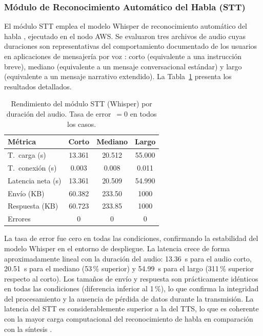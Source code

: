 \documentclass[journal]{IEEEtran}
\begin{document}
	\subsubsection{M\'odulo de Reconocimiento Autom\'atico del Habla (STT)}
	El m\'odulo STT emplea el modelo Whisper de reconocimiento autom\'atico del habla \cite{radford2023}, ejecutado en el nodo AWS. Se evaluaron tres archivos de audio cuyas duraciones son representativas del comportamiento documentado de los usuarios en aplicaciones de mensajer\'ia por voz \cite{botelho2021}: corto (equivalente a una instrucci\'on breve), mediano (equivalente a un mensaje conversacional est\'andar) y largo (equivalente a un mensaje narrativo extendido). La Tabla~\ref{tab:stt} presenta los resultados detallados.
	
	\begin{table}[!t]
		\caption{Rendimiento del m\'odulo STT (Whisper) por duraci\'on del audio. Tasa de error~$= 0$ en todos los casos.}
		\label{tab:stt}
		\centering
		\renewcommand{\arraystretch}{1.25}
		\begin{tabular}{lccc}
			\toprule
			\textbf{M\'etrica} & \textbf{Corto} & \textbf{Mediano} & \textbf{Largo} \\
			\midrule
			T.\ carga (s)         & 13.361  & 20.512  & 55.000 \\
			T.\ conexi\'on (s)    & 0.003   & 0.008   & 0.011  \\
			Latencia neta (s)     & 13.361  & 20.509  & 54.990 \\
			Env\'io (KB)          & 60.382  & 233.50  & 1000   \\
			Respuesta (KB)        & 60.723  & 233.85  & 1000   \\
			Errores               & 0       & 0       & 0      \\
			\bottomrule
		\end{tabular}
	\end{table}
	
	La tasa de error fue cero en todas las condiciones, confirmando la estabilidad del modelo Whisper en el entorno de despliegue. La latencia crece de forma aproximadamente lineal con la duraci\'on del audio: 13.36~s para el audio corto, 20.51~s para el mediano (53\,\% superior) y 54.99~s para el largo (311\,\% superior respecto al corto). Los tama\~nos de env\'io y respuesta son pr\'acticamente id\'enticos en todas las condiciones (diferencia inferior al 1\,\%), lo que confirma la integridad del procesamiento y la ausencia de p\'erdida de datos durante la transmisi\'on. La latencia del STT es considerablemente superior a la del TTS, lo que es coherente con la mayor carga computacional del reconocimiento de habla en comparaci\'on con la s\'intesis \cite{baevski2020}.
	
\end{document}
